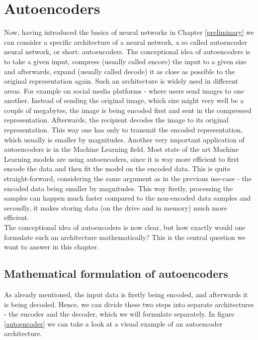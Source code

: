 \justifying
\chapter{Autoencoders}

Now, having introduced the basics of neural networks in Chapter \ref{preliminary} we can consider a specific architecture of a neural network, a so called autoencoder neural network, or short: autoencoders. The conceptional idea of autoencoders is to take a given input, compress (usually called encore) the input to a given size and afterwards, expand (usually called decode) it as close as possible to the original representation again. Such an architecture is widely used in different areas. For example on social media platforms - where users send images to one another. Instead of sending the original image, which size might very well be a couple of megabytes, the image is being encoded first and sent in the compressed representation. Afterwards, the recipient decodes the image to its original representation. This way one has only to transmit the encoded representation, which usually is smaller by magnitudes.
Another very important application of autoencoders is in the Machine Learning field. Most state of the art Machine Learning models are using autoencoders, since it is way more efficient to first encode the data and then fit the model on the encoded data. This is quite straight-forward, considering the same argument as in the previous use-case - the encoded data being smaller by magnitudes. This way firstly, processing the samples can happen much faster compared to the non-encoded data samples and secondly, it makes storing data (on the drive and in memory) much more efficient.\\
The conceptional idea of autoencoders is now clear, but how exactly would one formulate such an architecture mathematically? This is the central question we want to answer in this chapter.

\section{Mathematical formulation of autoencoders}

As already mentioned, the input data is firstly being encoded, and afterwards it is being decoded. Hence, we can divide these two steps into separate architectures - the encoder and the decoder, which we will formulate separately. In figure \ref{autoencoder} we can take a look at a visual example of an autoencoder architecture.


